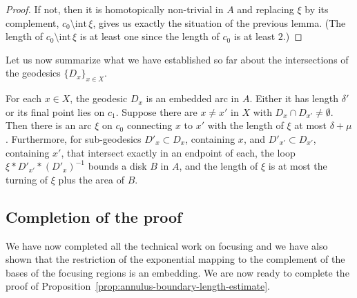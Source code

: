 \begin{proof}
If not, then it is homotopically non-trivial in $A$ and replacing
$\xi$ by its complement, $c_0\setminus\mathrm{int}\,\xi$, gives us
exactly the situation of the previous lemma. (The length of
$c_0\setminus\mathrm{int}\,\xi$ is at least one since the length of
$c_0$ is at least $2$.)
\end{proof}


Let us now summarize what we have established so far about the intersections of
the geodesics $\{D_x\}_{x\in X}$.

\begin{corollary}
\label{cor:geodesic-family-intersection-summary}
\label{focussummary}
For each $x\in X$, the geodesic $D_x$ is an embedded arc in $A$.
Either it has length $\delta'$ or its final point lies on $c_1$.
Suppose there are   $x\not=x'$ in $X$ with $D_x\cap
D_{x'}\not=\emptyset$. Then there is an arc $\xi$ on $c_0$
connecting $x$ to $x'$ with the length of $\xi$ at most
$\delta+\mu$. Furthermore, for sub-geodesics $D'_x\subset D_x$,
containing $x$, and $D'_{x'}\subset D_{x'}$, containing $x'$, that
intersect exactly in an endpoint of each, the loop
$\xi*D'_{x'}*(D'_x)^{-1}$ bounds a disk $B$ in $A$, and the length
of $\xi$ is at most the turning of $\xi$ plus the area of $B$.
\end{corollary}

\subsection{Completion of the proof}

We have now completed all the technical work on focusing and we have
also shown that  the restriction of the exponential mapping to the
complement of the bases of the focusing regions is an embedding. We
are now ready to complete the proof of
Proposition~\ref{prop:annulus-boundary-length-estimate}.


